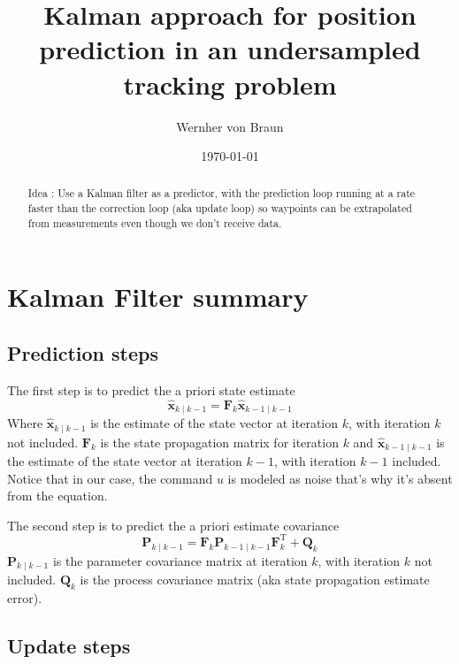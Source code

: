 \documentclass[12pt]{article}
\begin{document}
\title{Kalman approach for position prediction in an undersampled tracking problem}
\author{Wernher von Braun}
\date{\today}
\maketitle

\begin{abstract}
Idea : Use a Kalman filter as a predictor, with the prediction loop running at a rate faster than the correction loop (aka update loop) so waypoints can be extrapolated from measurements even though we don't receive data.
\end{abstract}


\section{Kalman Filter summary}

\subsection{Prediction steps}

The first step is to predict the a priori state estimate
\begin{equation}
\hat{\mathbf{x}}_{k\mid k-1} = \mathbf{F}_{k}\hat{\mathbf{x}}_{k-1\mid k-1}
\end{equation}
Where $\hat{\mathbf{x}}_{k\mid k-1}$ is the estimate of the state vector at iteration $k$, with iteration $k$ not included.
$\mathbf{F}_{k}$ is the state propagation matrix for iteration $k$ and $\hat{\mathbf{x}}_{k-1\mid k-1}$ is the estimate of the state vector at iteration $k-1$, with iteration $k-1$ included.
Notice that in our case, the command $u$ is modeled as noise that's why it's absent from the equation.

The second step is to predict the a priori estimate covariance
\begin{equation}
\mathbf{P}_{k\mid k-1} = \mathbf{F}_{k} \mathbf{P}_{k-1\mid k-1} \mathbf{F}_{k}^{\text{T}} + \mathbf{Q}_{k}
\end{equation}
$\mathbf{P}_{k\mid k-1}$ is the parameter covariance matrix at iteration $k$, with iteration $k$ not included.
$\mathbf{Q}_{k}$ is the process covariance matrix (aka state propagation estimate error).

\subsection{Update steps}
\end{document}
